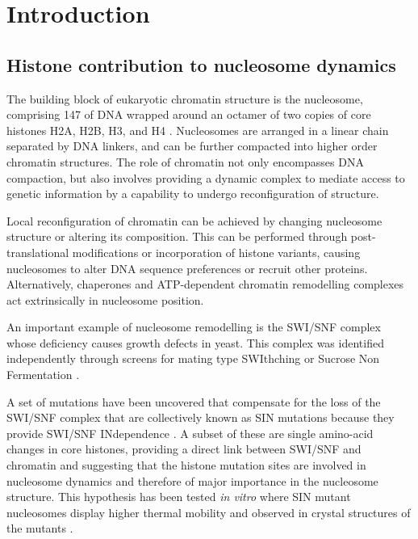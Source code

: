 \section{Introduction}

  \subsection{Histone contribution to nucleosome dynamics}

    The building block of eukaryotic chromatin structure is the nucleosome, comprising
    \SI{147}{\bp} of DNA wrapped around an octamer of two copies of core histones H2A,
    H2B, H3, and H4 \citep{luger1997crystal}.
    Nucleosomes are arranged in a linear chain separated by DNA linkers, and
    can be further compacted into higher order chromatin structures.
    The role of chromatin not only encompasses DNA compaction,
    but also involves providing a dynamic complex to mediate access to genetic
    information by a capability to undergo reconfiguration of structure. 

    Local reconfiguration of chromatin can be achieved
    by changing nucleosome structure or altering its composition.
    This can be performed through post-translational modifications
    or incorporation of histone variants,
    causing nucleosomes to alter DNA sequence preferences or recruit other proteins.
    Alternatively, chaperones and ATP-dependent chromatin remodelling complexes
    act extrinsically in nucleosome position.

    An important example of nucleosome remodelling is the SWI/SNF complex
    whose deficiency causes growth defects in yeast.
    This complex was identified independently through screens for
    mating type SWIthching \citep{SWI-mutants}
    or Sucrose Non Fermentation \citep{SNF-mutants-original-discovery, SNF-mutants2}.

    A set of mutations have been uncovered that compensate
    for the loss of the SWI/SNF complex
    that are collectively known as SIN mutations because they
    provide SWI/SNF INdependence  .
    A subset of these are single amino-acid changes in core histones,
    providing a direct link between SWI/SNF and chromatin and suggesting
    that the histone mutation sites are involved in nucleosome dynamics and therefore
    of major importance in the nucleosome structure. This hypothesis has been tested \textit{in vitro}
    where SIN mutant nucleosomes display higher thermal mobility \citep{flaus2004sin}
    and observed in crystal structures of the mutants .

